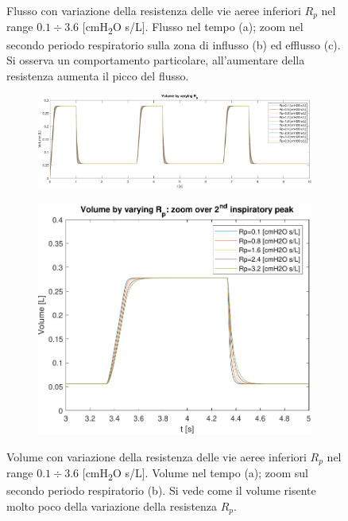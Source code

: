\begin{figure}[t!]
\begin{subfigure}{0.5\linewidth}
		\caption{}
	\end{subfigure}\hfill
	\caption{Flusso con variazione della resistenza delle vie aeree inferiori $R_p$ nel range $0.1\div 3.6$ [cmH\textsubscript{2}O s/L]. Flusso nel tempo (a); zoom nel secondo periodo respiratorio sulla zona di influsso (b) ed efflusso (c). Si osserva un comportamento particolare, all'aumentare della resistenza aumenta il picco del flusso.}
	\label{fig:Rp_flux}
	\vspace{0.6 cm}
	\begin{subfigure}{0.7\linewidth}
		\centering
		\includegraphics[width=0.95\linewidth]{../model/data_log/Rp_volume_total.pdf}
		\caption{}
	\end{subfigure}\hfill
	\begin{subfigure}{0.3\linewidth}
		\centering
		\includegraphics[width=0.95\linewidth]{../model/data_log/Rp_volume_zoom.pdf}
		\caption{}
	\end{subfigure}\hfill
	\caption{Volume con variazione della resistenza delle vie aeree inferiori $R_p$ nel range $0.1\div 3.6$ [cmH\textsubscript{2}O s/L]. Volume nel tempo (a); zoom sul secondo periodo respiratorio (b). Si vede come il volume risente molto poco della variazione della resistenza $R_p$. }
	\label{fig:Rp_volume}
\end{figure}


